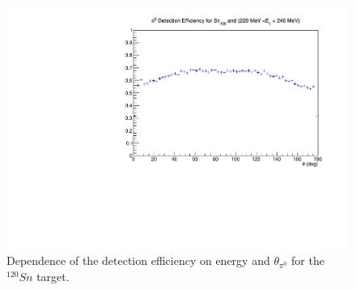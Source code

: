 \begin{figure}[H]
\begin{center}
\includegraphics[scale=0.4]{pictures/pdf/pi0_efficiency_Sn120_Ebin9.pdf}
\caption{Dependence of the detection efficiency on energy and $\theta_{\pi^{0}}$ for the $^{120}Sn$ target.}
\label{detectioneff2}
\end{center}
\end{figure}

